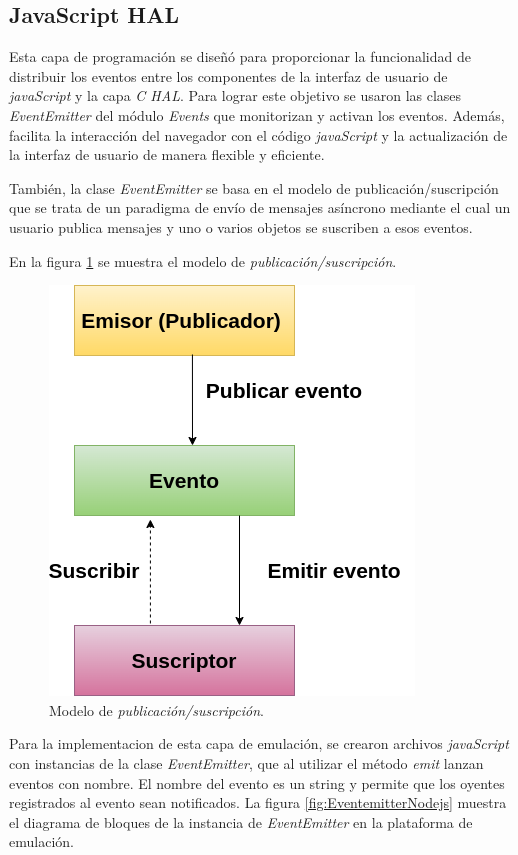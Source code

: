 \subsection{JavaScript HAL}

Esta capa de programación se diseñó para proporcionar la funcionalidad de distribuir los eventos entre los componentes de la interfaz de usuario de \textit{javaScript} y la capa \textit{C HAL}. Para lograr este objetivo se usaron las clases \textit{EventEmitter} del módulo \textit{Events} que monitorizan y activan los eventos. Además, facilita la interacción del navegador con el código \textit{javaScript} y la actualización de la interfaz de usuario de manera flexible y eficiente.

También, la clase \textit{EventEmitter} se basa en el modelo de publicación/suscripción que se trata de un paradigma de envío de mensajes asíncrono mediante el cual un usuario publica mensajes y uno o varios objetos se suscriben a esos eventos.

En la figura \ref{fig:PublicarSuscribir} se muestra el modelo de \textit{publicación/suscripción}.

\begin{figure}[ht]
	\centering
	\includegraphics[scale=.49]{./Figures/PublicarSuscribir.png}
	\caption{Modelo de \textit{publicación/suscripción}.}
	\label{fig:PublicarSuscribir}
\end{figure}


Para la implementacion de esta capa de emulación, se crearon archivos \textit{javaScript} con instancias de la clase \textit{EventEmitter}, que al utilizar el método \textit{emit} lanzan eventos con nombre. El nombre del evento es un string y permite que los oyentes registrados al evento sean notificados. La figura \ref{fig:EventemitterNodejs} muestra el diagrama de bloques de la instancia de \textit{EventEmitter} en la plataforma de emulación.

